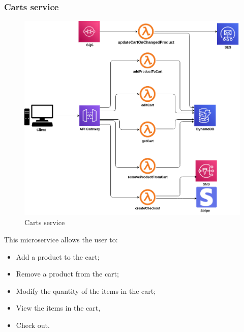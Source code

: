 \subsubsection{Carts service}
\begin{figure}[!h]
    \vspace{5px}
    \includegraphics[scale=0.5]{../../../../Images/Diagrammi/maintainerManual/cartService.png}
    \centering
    \caption{Carts service}
\end{figure}
This microservice allows the user to:
\begin{itemize}
    \item Add a product to the cart;
    \item Remove a product from the cart;
    \item Modify the quantity of the items in the cart;
    \item View the items in the cart,
    \item Check out.
\end{itemize}
\pagebreak
